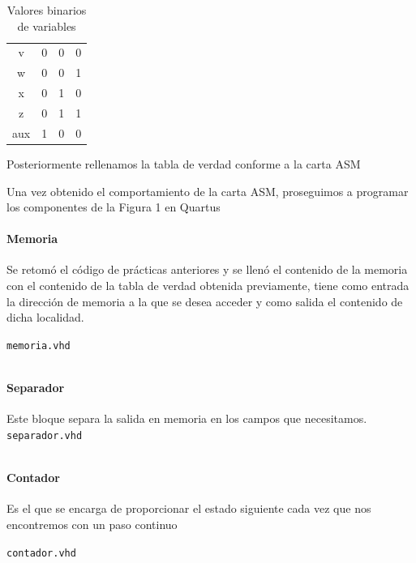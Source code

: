 \documentclass[table]{scrartcl}
\newenvironment{code}{\captionsetup{type=listing}}{}
\begin{document}
\begin{table}[H]
  \centering
\caption{Valores binarios de variables}
\begin{tabular}{cccc}
\rowcolor[HTML]{E6B8AF}
v & 0 & 0 & 0 \\
\rowcolor[HTML]{F4CCCC}
w & 0 & 0 & 1 \\
\rowcolor[HTML]{FCE5CD}
x & 0 & 1 & 0 \\
\rowcolor[HTML]{FFF2CC}
z & 0 & 1 & 1 \\
\rowcolor[HTML]{D9EAD3}
aux & 1 & 0 & 0
\end{tabular}
\end{table}
Posteriormente rellenamos la tabla de verdad conforme a la carta ASM
\begin{center}
  
\end{center}
Una vez obtenido el comportamiento de la carta ASM, proseguimos a programar los
componentes de la Figura 1 en Quartus

\paragraph{Memoria}

Se retomó el código de prácticas anteriores y se llenó el contenido de la
memoria con el contenido de la tabla de verdad obtenida previamente, tiene como
entrada la dirección de memoria a la que se desea acceder y como salida el
contenido de dicha localidad.
\begin{code}
  \caption{\texttt{memoria.vhd}}
  \inputminted{vhdl}{./memoria.vhd}
\end{code}

\paragraph{Separador}

Este bloque separa la salida en memoria en los campos que necesitamos.
\begin{code}
  \texttt{separador.vhd}
  \inputminted{vhdl}{./separador.vhd}
\end{code}

\paragraph{Contador}

Es el que se encarga de proporcionar el estado siguiente cada vez que nos encontremos con un paso continuo
\begin{code}
  \caption{\texttt{contador.vhd}}
  \inputminted{vhdl}{./contador.vhd}
\end{code}
\end{document}

